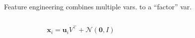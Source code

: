 \documentclass[
  ignorenonframetext,
  aspectratio=169]{beamer}
\begin{document}
\begin{frame}{Feature engineering combines multiple vars. to a
``factor'' var.}
\protect\hypertarget{feature-engineering-combines-multiple-vars.-to-a-factor-var.}{}
\begin{columns}[T]
\begin{column}{.5\textwidth}
\scriptsize

\normalsize

\scriptsize

\normalsize

\[\mathbf{x}_{i} = \mathbf{u}_{i} V^{\top} + \mathcal{N}\!\left(\mathbf{0},I\right)\]

\scriptsize

\normalsize

\scriptsize


\normalsize
\end{column}

\begin{column}{.5\textwidth}
\scriptsize

\normalsize

\scriptsize


\normalsize
\end{column}
\end{columns}
\end{frame}
\end{document}
